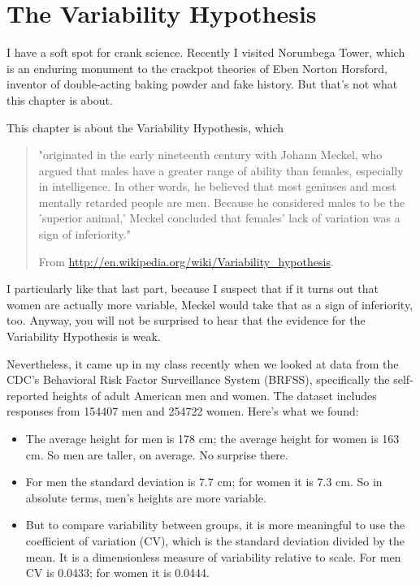 \documentclass[12pt]{book}
\begin{document}
\section{The Variability Hypothesis}

I have a soft spot for crank science.  Recently I visited Norumbega
Tower, which is an enduring monument to the crackpot theories of Eben
Norton Horsford, inventor of double-acting baking powder and fake
history.  But that's not what this chapter is about.

This chapter is about the Variability Hypothesis, which

\begin{quote}
"originated in the early nineteenth century with Johann Meckel, who
  argued that males have a greater range of ability than females,
  especially in intelligence. In other words, he believed that most
  geniuses and most mentally retarded people are men. Because he
  considered males to be the 'superior animal,' Meckel concluded that
  females' lack of variation was a sign of inferiority."

From \url{http://en.wikipedia.org/wiki/Variability_hypothesis}.
\end{quote}

I particularly like that last part, because I suspect that if it turns
out that women are actually more variable, Meckel would take that as a
sign of inferiority, too.  Anyway, you will not be surprised to hear
that the evidence for the Variability Hypothesis is weak.

Nevertheless, it came up in my class recently when we looked at data
from the CDC's Behavioral Risk Factor Surveillance System (BRFSS),
specifically the self-reported heights of adult American men and women.
The dataset includes responses from 154407 men and 254722 women.
Here's what we found:

\begin{itemize}

\item The average height for men is 178 cm; the average height for
  women is 163 cm.  So men are taller, on average.  No surprise there.

\item For men the standard deviation is 7.7 cm; for women it is 7.3
  cm.  So in absolute terms, men's heights are more variable.

\item But to compare variability between groups, it is more meaningful
  to use the coefficient of variation (CV), which is the standard
  deviation divided by the mean.  It is a dimensionless measure of
  variability relative to scale.  For men CV is 0.0433; for women it
  is 0.0444.

\end{itemize}
\end{document}
